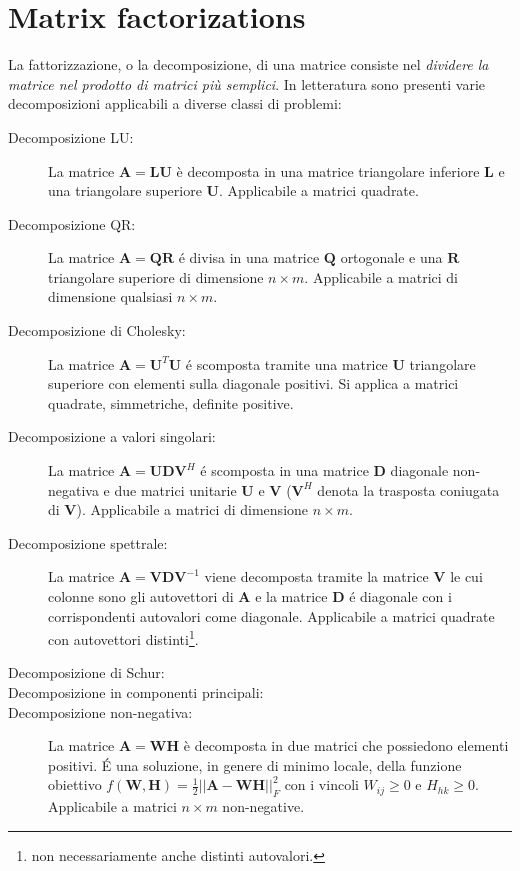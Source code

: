 \documentclass[10pt]{article}
\begin{document}
\section{Matrix factorizations}

La fattorizzazione, o la decomposizione, di una matrice consiste nel \emph{dividere la matrice nel prodotto di matrici più semplici}.
In letteratura sono presenti varie decomposizioni applicabili a diverse classi di problemi:
\begin{description}
\item[Decomposizione LU:] La matrice $\mathbf{A}=\mathbf{L}\mathbf{U}$ è decomposta in una matrice triangolare inferiore $\mathbf{L}$ e una triangolare superiore $\mathbf{U}$. Applicabile a matrici quadrate.
\item[Decomposizione QR:] La matrice $\mathbf{A}=\mathbf{Q}\mathbf{R}$ é divisa in una matrice $\mathbf{Q}$ ortogonale e una $\mathbf{R}$ triangolare superiore di dimensione $n\times m$. Applicabile a matrici di dimensione qualsiasi $n\times m$.
\item[Decomposizione di Cholesky:] La matrice $\mathbf{A}=\mathbf{U}^T\mathbf{U}$ é scomposta tramite una matrice $\mathbf{U}$ triangolare superiore con elementi sulla diagonale positivi. Si applica a matrici quadrate, simmetriche, definite positive.
\item[Decomposizione a valori singolari:] La matrice $\mathbf{A}=\mathbf{U}\mathbf{D}\mathbf{V}^H$ é scomposta in una matrice $\mathbf{D}$ diagonale non-negativa e due matrici unitarie $\mathbf{U}$ e $\mathbf{V}$ ($\mathbf{V}^H$ denota la trasposta coniugata di $\mathbf{V}$). Applicabile a matrici di dimensione $n\times m$.
\item[Decomposizione spettrale:] La matrice $\mathbf{A}=\mathbf{V}\mathbf{D}\mathbf{V}^{-1}$ viene decomposta tramite la matrice $\mathbf{V}$ le cui colonne sono gli autovettori di $\mathbf{A}$ e la matrice $\mathbf{D}$ é diagonale con i corrispondenti autovalori come diagonale. Applicabile a matrici quadrate con autovettori distinti\footnote{non necessariamente anche distinti autovalori.}.
\item[Decomposizione di Schur:]
\item[Decomposizione in componenti principali:]
\item[Decomposizione non-negativa:] La matrice $\mathbf{A}=\mathbf{W}\mathbf{H}$ è decomposta in due matrici che possiedono elementi positivi. É una soluzione, in genere di minimo locale, della funzione obiettivo $f(\mathbf{W},\mathbf{H})=\frac{1}{2}||\mathbf{A}-\mathbf{W}\mathbf{H}||^2_F$ con i vincoli $W_{ij} \geq 0$ e $H_{hk}\geq 0$. Applicabile a matrici $n\times m$ non-negative.
\end{description}
\end{document}
